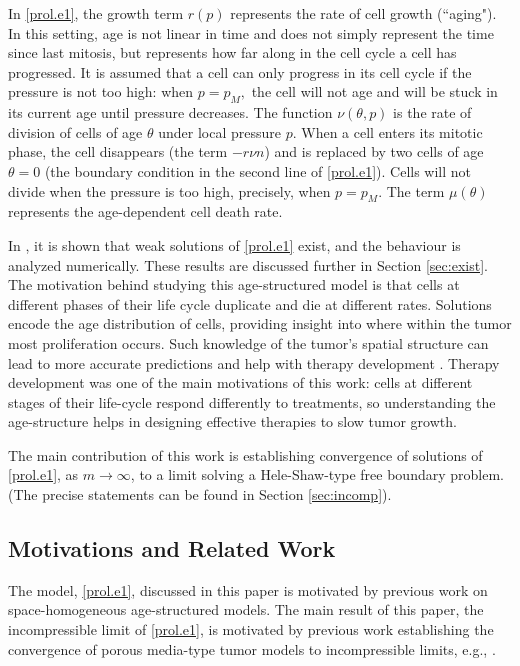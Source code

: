 \documentclass{amsart}
\begin{document}
In \eqref{prol.e1}, the growth term $r(p)$ represents the rate of cell growth (``aging"). In this setting, age is not linear in time and does not simply represent the time since last mitosis, but represents how far along in the cell cycle a cell has progressed. It is assumed that a cell can only progress in its cell cycle if the pressure is not too high: when $p=p_M,$ the cell will not age and will be stuck in its current age until pressure decreases. The function $\nu(\theta,p)$ is the rate of division of cells of age $\theta$ under local pressure $p$. When a cell enters its mitotic phase, the cell disappears (the term $-r\nu n$) and is replaced by two cells of age $\theta=0$ (the boundary condition in the second line of \eqref{prol.e1}). Cells will not divide when the pressure is too high, precisely, when $p=p_M.$ The term  $\mu(\theta)$ represents the age-dependent cell death rate. 

In \cite{llmw}, it is shown that weak solutions of \eqref{prol.e1} exist, and the behaviour is analyzed numerically. These results are discussed further in Section \ref{sec:exist}. The motivation behind studying this age-structured model is that cells at different phases of
their life cycle duplicate and die at different rates. Solutions encode the age
distribution of cells, providing insight into where within the tumor most proliferation occurs. Such knowledge of the tumor’s spatial structure can lead to more accurate predictions and help with therapy development \cite{lewin,noble}.  Therapy development was one of the main motivations of this work: cells at different stages of their life-cycle respond differently to treatments, so understanding the age-structure helps in designing effective therapies to slow tumor growth. 

 The main contribution of this work is establishing convergence of solutions of \eqref{prol.e1}, as $m \rightarrow \infty$, to a limit solving a Hele-Shaw-type free boundary problem. (The precise statements can be found in Section \ref{sec:incomp}). 

\subsection{Motivations and Related Work}
The model, \eqref{prol.e1}, discussed in this paper is motivated by previous work on space-homogeneous age-structured models. The main result of this paper, the incompressible limit of \eqref{prol.e1}, is motivated by previous work establishing the convergence of porous media-type tumor models to incompressible limits, e.g., \cite{PerthameQuiros2014,david, mellet2015heleshawproblemtumorgrowth,kim2022,david2020freeboundarylimittumor}.
\end{document}
